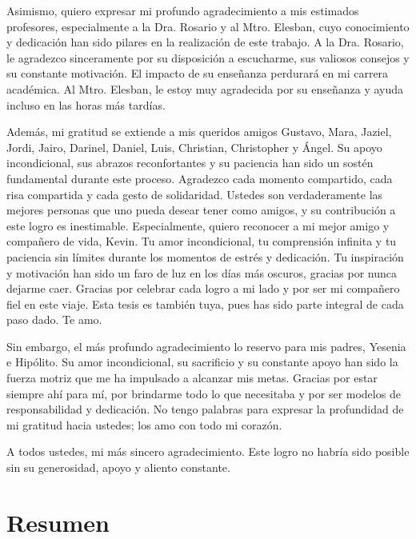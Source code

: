 \documentclass[
  us-letterpaper,
]{scrreprt}
\renewcommand*\contentsname{Tabla de contenidos}
\newcommand\contentsname{Tabla de contenidos}
\theoremstyle{plain}
\theoremstyle{definition}
\theoremstyle{definition}
\theoremstyle{plain}
\theoremstyle{remark}
\begin{document}
Asimismo, quiero expresar mi profundo agradecimiento a mis estimados profesores, especialmente a la Dra. Rosario y al Mtro. Elesban, cuyo conocimiento y dedicación han sido pilares en la realización de este trabajo. A la Dra. Rosario, le agradezco sinceramente por su disposición a escucharme, sus valiosos consejos y su constante motivación. El impacto de su enseñanza perdurará en mi carrera académica. Al Mtro. Elesban, le estoy muy agradecida por su enseñanza y ayuda incluso en las horas más tardías.

Además, mi gratitud se extiende a mis queridos amigos Gustavo, Mara, Jaziel, Jordi, Jairo, Darinel, Daniel, Luis, Christian, Christopher y Ángel. Su apoyo incondicional, sus abrazos reconfortantes y su paciencia han sido un sostén fundamental durante este proceso. Agradezco cada momento compartido, cada risa compartida y cada gesto de solidaridad. Ustedes son verdaderamente las mejores personas que uno pueda desear tener como amigos, y su contribución a este logro es inestimable. Especialmente, quiero reconocer a mi mejor amigo y compañero de vida, Kevin. Tu amor incondicional, tu comprensión infinita y tu paciencia sin límites durante los momentos de estrés y dedicación. Tu inspiración y motivación han sido un faro de luz en los días más oscuros, gracias por nunca dejarme caer. Gracias por celebrar cada logro a mi lado y por ser mi compañero fiel en este viaje. Esta tesis es también tuya, pues has sido parte integral de cada paso dado. Te amo.

Sin embargo, el más profundo agradecimiento lo reservo para mis padres, Yesenia e Hipólito. Su amor incondicional, su sacrificio y su constante apoyo han sido la fuerza motriz que me ha impulsado a alcanzar mis metas. Gracias por estar siempre ahí para mí, por brindarme todo lo que necesitaba y por ser modelos de responsabilidad y dedicación. No tengo palabras para expresar la profundidad de mi gratitud hacia ustedes; los amo con todo mi corazón.

A todos ustedes, mi más sincero agradecimiento. Este logro no habría sido posible sin su generosidad, apoyo y aliento constante.
\renewcommand*\contentsname{Tabla de contenidos}
{
\hypersetup{linkcolor=}
\setcounter{tocdepth}{2}
\tableofcontents
}

\chapter*{Resumen}\label{resumen}
\end{document}
